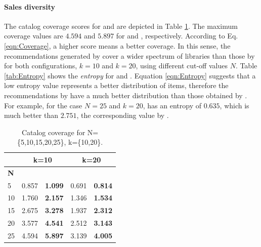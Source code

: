 




\vspace{.1cm}
\noindent
\paragraph{\textbf{Sales diversity}} The catalog coverage scores for \LR and \CR are depicted in Table 
\ref{tab:CatalogCoverage}. The maximum coverage values are $4.594$ and $5.897$ for \LR and 
\CR, respectively. According to Eq. \eqref{eqn:Coverage}, a higher score means a better 
coverage. In this sense, the recommendations generated by \CR cover a wider spectrum of 
libraries than those by \LR for both configurations, \ie $k=10$ and $k=20$, using different 
cut-off values $N$. Table \ref{tab:Entropy} shows the \emph{entropy} for \LR and \CR. 
Equation \eqref{eqn:Entropy} suggests that a low entropy value represents a better distribution of 
items, therefore the recommendations by \CR have a much better distribution than those 
obtained by \LR. For example, for the case $N=25$ and $k=20$, \CR has an entropy of $0.635$, 
which is much better than $2.751$, the corresponding value by \LR.

\begin{table}[h!]
	\footnotesize
	\caption{Catalog coverage for N=\{5,10,15,20,25\}, k=\{10,20\}.}
	\centering
	\begin{tabular}{|p{0.8cm}||p{1.2cm}|p{1.2cm}||p{1.2cm}|p{1.2cm}|} \hline	
		& \multicolumn{2}{c||}{\textbf{k=10}}  & \multicolumn{2}{c|}{\textbf{k=20}} \\ \hline
		\textbf{N}	& \LR    & \CR  & \LR    & \CR	  \\ \hline	
		5       & 0.857   	  & \textbf{1.099}  	& 0.691 		& \textbf{0.814}    \\ \hline
		10      & 1.760      & \textbf{2.157}  	& 1.346 		& \textbf{1.534}    \\ \hline
		15      & 2.675      & \textbf{3.278}  	& 1.937 		& \textbf{2.312}    \\ \hline
		20      & 3.577      & \textbf{4.541}  	& 2.512 		& \textbf{3.143}    \\ \hline
		25      & 4.594      & \textbf{5.897}  	& 3.139 		& \textbf{4.005}    \\ \hline
	\end{tabular}
	\label{tab:CatalogCoverage}
\end{table}

